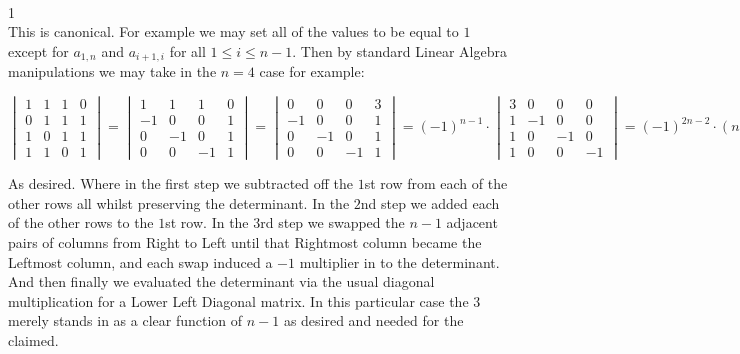 
 \\
1 \\
This is canonical. For example we may set all of the values to be equal to $1$ except for $a_{1,n}$ and $a_{i+1,i}$ for all $1 \le i \le n-1$. Then by standard Linear Algebra manipulations we may take in the $n=4$ case for example:

$
\begin{vmatrix}
1 & 1 & 1 & 0 \\
0 & 1 & 1 & 1 \\
1 & 0 & 1 & 1 \\
1 & 1 & 0 & 1
\end{vmatrix}
=
\begin{vmatrix}
1 & 1 & 1 & 0 \\
-1 & 0 & 0 & 1 \\
0 & -1 & 0 & 1 \\
0 & 0 & -1 & 1
\end{vmatrix}
=
\begin{vmatrix}
0 & 0 & 0 & 3 \\
-1 & 0 & 0 & 1 \\
0 & -1 & 0 & 1 \\
0 & 0 & -1 & 1
\end{vmatrix}
=
(-1)^{n-1} \cdot
\begin{vmatrix}
3 & 0 & 0 & 0 \\
1 & -1 & 0 & 0 \\
1 & 0 & -1 & 0 \\
1 & 0 & 0 & -1
\end{vmatrix}
=
(-1)^{2n-2} \cdot (n-1)
=
\boxed{n-1}
$

As desired. Where in the first step we subtracted off the $1$st row from each of the other rows all whilst preserving the determinant. In the $2$nd step we added each of the other rows to the $1$st row. In the $3$rd step we swapped the $n-1$ adjacent pairs of columns from Right to Left until that Rightmost column became the Leftmost column, and each swap induced a $-1$ multiplier in to the determinant. And then finally we evaluated the determinant via the usual diagonal multiplication for a Lower Left Diagonal matrix. In this particular case the $3$ merely stands in as a clear function of $n-1$ as desired and needed for the claimed.

